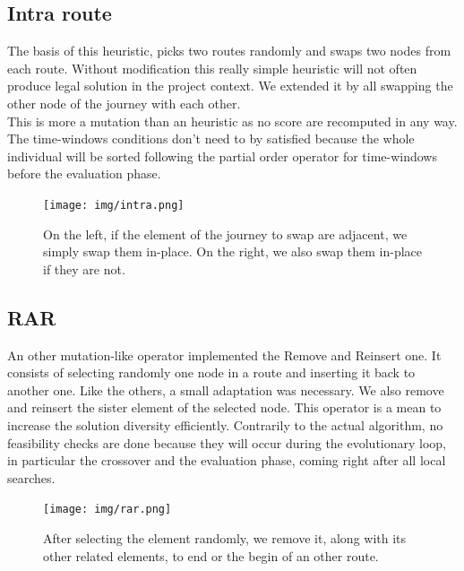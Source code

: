 \documentclass[12pt]{memoir}
\begin{document}
\subsection{Intra route}
The basis of this heuristic\cite{tan2003multiobjective}, picks two routes randomly and swaps two nodes from each route.
Without modification this really simple heuristic will not often produce legal solution in
the project context. We extended it by all swapping the other node of the journey with each other.\\
This is more a mutation than an heuristic as no score are recomputed in any way. The time-windows conditions
don't need to by satisfied because the whole individual will be sorted following the partial order operator
for time-windows before the evaluation phase.\\
\begin{figure}[htbp]
	\begin{center}
		\texttt{[image: img/intra.png]}
		\caption{On the left, if the element of the journey to swap are adjacent, we
    simply swap them in-place. On the right, we also swap them in-place if they are
    not.}
	\end{center}
\end{figure}

\subsection{RAR}
An other mutation-like operator implemented the Remove and Reinsert\cite{tan2003multiobjective} one. It consists of selecting randomly one node
in a route and inserting it back to another one. Like the others, a small adaptation was necessary.
We also remove and reinsert the sister element of the selected node. This operator is a mean
to increase the solution diversity efficiently. Contrarily to the actual algorithm, no feasibility checks are
done because they will occur during the evolutionary loop, in particular the crossover and
the evaluation phase, coming right after all local searches. \\

\begin{figure}[htbp]
	\begin{center}
		\texttt{[image: img/rar.png]}
		\caption{After selecting the element randomly, we remove it, along with its
    other related elements, to end or the begin of an other route.}
	\end{center}
\end{figure}
\end{document}
